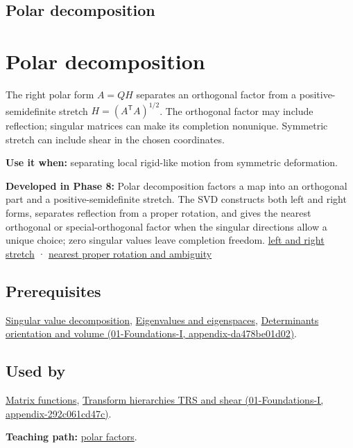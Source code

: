 \hypertarget{appendix-73f5bcf7a462}{}
\section*{Polar decomposition}
\chapter{Polar decomposition}\label{appendix-73f5bcf7a462-polar-decomposition}

The right polar form \(A=QH\) separates an orthogonal factor from a positive-semidefinite stretch \(H=(A^\mathsf T A)^{1/2}\). The orthogonal factor may include reflection; singular matrices can make its completion nonunique. Symmetric stretch can include shear in the chosen coordinates.

\textbf{Use it when:} separating local rigid-like motion from symmetric deformation.

\textbf{Developed in Phase 8:} Polar decomposition factors a map into an orthogonal part and a positive-semidefinite stretch. The SVD constructs both left and right forms, separates reflection from a proper rotation, and gives the nearest orthogonal or special-orthogonal factor when the singular directions allow a unique choice; zero singular values leave completion freedom. \href{Continuous\%20Notes/Computing\%20Foundations\%20-\%20From\%20Bits\%20to\%20C++\%20and\%20Systems\%20APIs\#Polar\%20decomposition\%20separates\%20frame\%20dependent\%20stretch\%20from\%20orientation}{left and right stretch} · \href{Continuous\%20Notes/Computing\%20Foundations\%20-\%20From\%20Bits\%20to\%20C++\%20and\%20Systems\%20APIs\#Two-sided\%20rotations,\%20nearest\%20proper\%20rotation,\%20and\%20nonunique\%20directions}{nearest proper rotation and ambiguity}

\section{Prerequisites}\label{appendix-73f5bcf7a462-prerequisites}

\hyperref[appendix-1fad5e7f36fa]{Singular value decomposition}, \hyperref[appendix-0b3be18411f9]{Eigenvalues and eigenspaces}, \href{../01-Foundations-I/main.pdf\#nameddest=appendix-da478be01d02}{Determinants orientation and volume (01-Foundations-I, appendix-da478be01d02)}.

\section{Used by}\label{appendix-73f5bcf7a462-used-by}

\hyperref[appendix-0f4bc2bf2b1f]{Matrix functions}, \href{../01-Foundations-I/main.pdf\#nameddest=appendix-292c061cd47c}{Transform hierarchies TRS and shear (01-Foundations-I, appendix-292c061cd47c)}.

\textbf{Teaching path:} \href{Continuous\%20Notes/Computing\%20Foundations\%20-\%20From\%20Bits\%20to\%20C++\%20and\%20Systems\%20APIs\#Polar\%20decomposition\%20separates\%20rotation-like\%20motion\%20from\%20stretch}{polar factors}.
